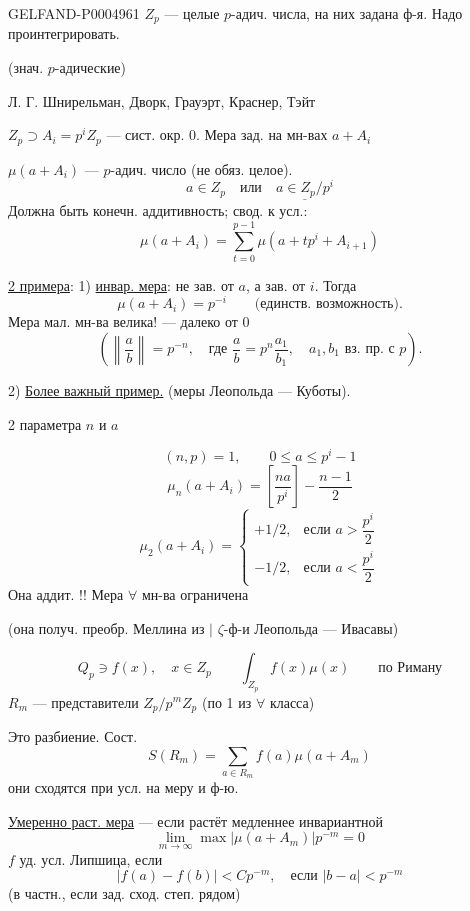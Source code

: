 \begin{GelfandAdjacentEvidence}{GELFAND-P000496}{1}
$Z_p$ — целые $p$-адич. числа, на них задана ф-я. Надо проинтегрировать.

(знач. $p$-адические)

 Л. Г. Шнирельман, Дворк, Грауэрт, Краснер, Тэйт

$Z_p\supset A_i=p^iZ_p$ — сист. окр. $0$.
Мера зад. на мн-вах $a+A_i$

$\mu(a+A_i)$ — $p$-адич. число (не обяз. целое).
\[
a\in Z_p\quad\text{или}\quad \underline{a\in Z_p/p^i}
\]
Должна быть конечн. аддитивность; свод. к усл.:
\[
\mu(a+A_i)=\sum_{t=0}^{p-1}\mu(a+tp^i+A_{i+1})
\]

\uline{2 примера}: 1) \uline{инвар. мера}: не зав. от $a$, а зав. от $i$.
Тогда
\[
\mu(a+A_i)=p^{-i}\qquad\text{(единств. возможность).}
\]
Мера мал. мн-ва велика! — далеко от $0$
\[
\left(\left\|\frac ab\right\|=p^{-n},\quad
\text{где }\frac ab=p^n\frac{a_1}{b_1},\quad
a_1,b_1\text{ вз. пр. с }p\right).
\]

2) \uline{Более важный пример.} (меры Леопольда — Куботы).
\begin{flushright}
2 параметра $n$ и $a$
\end{flushright}
\[
(n,p)=1,\qquad 0\le a\le p^i-1
\]
\[
\mu_n(a+A_i)=\left[\frac{na}{p^i}\right]-\frac{n-1}{2}
\]
\[
\mu_2(a+A_i)=
\begin{cases}
+1/2,&\text{если }a>\dfrac{p^i}{2}\\
-1/2,&\text{если }a<\dfrac{p^i}{2}
\end{cases}
\]
Она аддит. !! Мера $\forall$ мн-ва ограничена

(она получ. преобр. Меллина из $\vert$ $\zeta$-ф-и Леопольда — Ивасавы)
\end{GelfandAdjacentEvidence}


\[
Q_p\ni f(x),\quad x\in Z_p\qquad
\int_{Z_p}f(x)\mu(x)\qquad\text{по Риману}
\]
$R_m$ — представители $Z_p/p^mZ_p$ (по 1 из $\forall$ класса)

Это разбиение. Сост.
\[
S(R_m)=\sum_{a\in R_m}f(a)\mu(a+A_m)
\]
они сходятся при усл. на меру и ф-ю.

\uline{Умеренно раст. мера} — если растёт медленнее инвариантной
\[
\lim_{m\to\infty}\max|\mu(a+A_m)|p^{-m}=0
\]
$f$ уд. усл. Липшица, если
\[
 |f(a)-f(b)|<Cp^{-m},\quad\text{если }|b-a|<p^{-m}
\]
(в частн., если зад. сход. степ. рядом)

